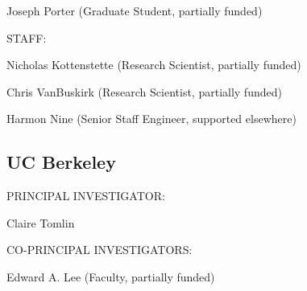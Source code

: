                \begin{indentation}{36pt}{0pt}{0pt}
                 Joseph Porter (Graduate Student, partially funded)
               \end{indentation}

               \begin{indentation}{0pt}{0pt}{0pt}
                 \uppercase{STAFF:}
               \end{indentation}

               \begin{indentation}{0pt}{0pt}{36pt}
                 Nicholas Kottenstette (Research Scientist, partially funded)
               \end{indentation}

               \begin{indentation}{0pt}{0pt}{36pt}
                 Chris VanBuskirk (Research Scientist, partially funded)
               \end{indentation}

               \begin{indentation}{0pt}{0pt}{36pt}
                 Harmon Nine (Senior Staff Engineer, supported elsewhere)
               \end{indentation}


               \subsection{UC Berkeley}

               \begin{indentation}{0pt}{0pt}{0pt}
                 \uppercase{PRINCIPAL INVESTIGATOR:}
               \end{indentation}
               
               \begin{indentation}{36pt}{0pt}{0pt}
                 Claire Tomlin
               \end{indentation}

               \begin{indentation}{0pt}{0pt}{0pt}
               \end{indentation}

               \begin{indentation}{0pt}{0pt}{0pt}
                 \uppercase{CO-PRINCIPAL INVESTIGATORS:}
               \end{indentation}

               \begin{indentation}{36pt}{0pt}{0pt}
                 Edward A. Lee (Faculty, partially funded)
               \end{indentation}

